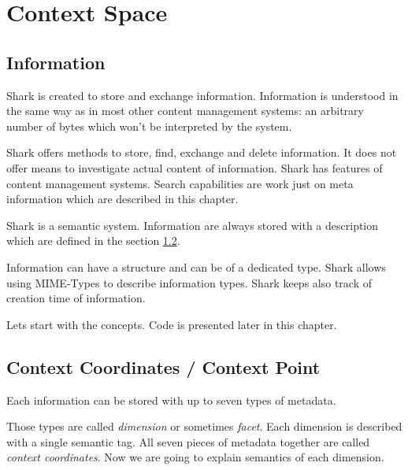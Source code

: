 \chapter{Context Space}
\label{sec:contextspace}
\section{Information}
Shark is created to store and exchange information. Information is understood in the same way as in most other content management systems: an arbitrary number of bytes which won't be interpreted by the system.

Shark offers methods to store, find, exchange and delete information. It does not offer means to investigate actual content of information. Shark has features of content management systems. Search capabilities are work just on meta information which are described in this chapter.

Shark is a semantic system. Information are always stored with a description which are defined in the section \ref{section:informationcontext}.

Information can have a structure and can be of a dedicated type. Shark allows using MIME-Types to describe information types. Shark keeps also track of creation time of information.

Lets start with the concepts. Code is presented later in this chapter.

\section{Context Coordinates / Context Point}
\label{section:informationcontext}
Each information can be stored with up to seven types of metadata.

Those types are called {\it dimension} or sometimes {\it facet}. Each dimension is described with a single semantic tag. All seven pieces of metadata together are called {\it context coordinates}.
Now we are going to explain semantics of each dimension.

